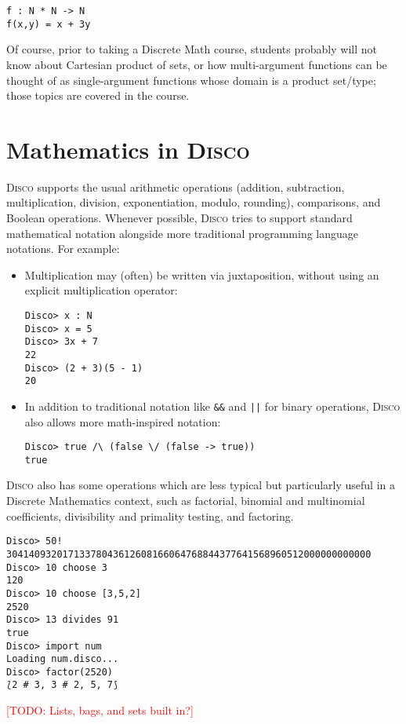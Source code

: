 \documentclass[submission,copyright,creativecommons]{eptcs}
\newcommand{\disco}{\textsc{Disco}\xspace}
\newcommand{\todo}[1]{\textcolor{red}{[TODO: #1]}}
\newcommand{\todo}[1]{}
\begin{document}
\begin{verbatim}
f : N * N -> N
f(x,y) = x + 3y
\end{verbatim}

Of course, prior to taking a Discrete Math course, students probably
will not know about Cartesian product of sets, or how multi-argument
functions can be thought of as single-argument functions whose domain
is a product set/type; those topics are covered in the course.

\section{Mathematics in \disco}
\label{sec:math}

\disco supports the usual arithmetic operations (addition,
subtraction, multiplication, division, exponentiation, modulo,
rounding), comparisons, and Boolean operations.  Whenever possible,
\disco tries to support standard mathematical notation alongside more
traditional programming language notations.  For example:
\begin{itemize}
\item Multiplication may (often) be written via juxtaposition, without
  using an explicit multiplication operator:
\begin{verbatim}
Disco> x : N
Disco> x = 5
Disco> 3x + 7
22
Disco> (2 + 3)(5 - 1)
20
\end{verbatim}
\item In addition to traditional notation like \verb|&&| and
  \verb+||+ for binary operations, \disco also allows more
  math-inspired notation:
\begin{verbatim}
Disco> true /\ (false \/ (false -> true))
true
\end{verbatim}
\end{itemize}

\disco also has some operations which are less typical but
particularly useful in a Discrete Mathematics context, such as
factorial, binomial and multinomial coefficients, divisibility and
primality testing, and factoring.

\begin{verbatim}
Disco> 50!
30414093201713378043612608166064768844377641568960512000000000000
Disco> 10 choose 3
120
Disco> 10 choose [3,5,2]
2520
Disco> 13 divides 91
true
Disco> import num
Loading num.disco...
Disco> factor(2520)
⟅2 # 3, 3 # 2, 5, 7⟆
\end{verbatim}

\todo{Lists, bags, and sets built in?}
\end{document}
